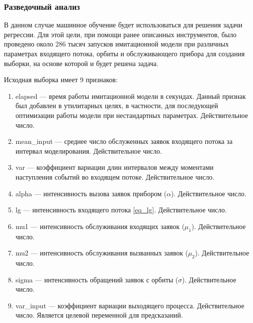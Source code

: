 \subsubsection{Разведочный анализ}
В данном случае машинное обучение будет использоваться для решения задачи регрессии. Для этой цели, при помощи ранее описанных инструментов, было проведено около 286 тысяч запусков имитационной модели при различных параметрах входящего потока, орбиты и обслуживающего прибора для создания выборки, на основе которой и будет решена задача.

Исходная выборка имеет 9 признаков:
\begin{enumerate}
	\item elapsed --- время работы имитационной модели в секундах. Данный признак был добавлен в утилитарных целях, в частности, для последующей оптимизации работы модели при нестандартных параметрах. Действительное число.
	\item mean\_input --- среднее число обслуженных заявок входящего потока за интервал моделирования. Действительное число.
	\item var --- коэффициент вариации длин интервалов между моментами наступления событий во входящем потоке. Действительное число.
	\item alpha --- интенсивность вызова заявок прибором ($\alpha$). Действительное число.
	\item lg --- интенсивность входящего потока \eqref{eq_lg}. Действительное число.
	\item mu1 --- интенсивность обслуживания входящих заявок ($\mu_1$). Действительное число.
	\item mu2 --- интенсивность обслуживания вызванных заявок ($\mu_2$). Действительное число.
	\item sigma --- интенсивность обращений заявок с орбиты ($\sigma$). Действительное число.
	\item var\_input --- коэффициент вариации выходящего процесса. Действительное число. Является целевой переменной для предсказаний.
\end{enumerate}

